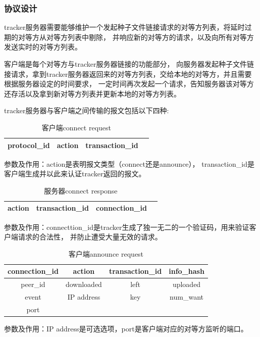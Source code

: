 \documentclass[15pt]{ctexart}
\begin{document}
		\subsubsection{协议设计} %
		\label{ssub:协议设计}
			\par tracker服务器需要能够维护一个发起种子文件链接请求的对等方列表，将延时过期的对等方从对等方列表中剔除，
			并响应新的对等方的请求，以及向所有对等方发送实时的对等方列表。
			\par 客户端是每个对等方与tracker服务器链接的功能部分，
			向服务器发起种子文件链接请求，拿到tracker服务器返回来的对等方列表，交给本地的对等方，并且需要根据服务器设定的时间要求，
			一定时间再次发起一个请求，告知服务器该对等方还存活以及拿到新对等方列表并更新本地的对等方列表。
			\\
			\par tracker服务器与客户端之间传输的报文包括以下四种:
			\begin{table}[H]
				\centering
				\begin{tabular}{|c|c|c|c|}
					\hline
					protocol\_id & action & transaction\_id \\
					\hline
				\end{tabular}
				\caption{客户端connect request}
			\end{table}
			\par 参数及作用：action是表明报文类型（connect还是announce），
			transaction\_id是客户端生成并以此来认证tracker返回的报文。
			\begin{table}[H]
				\centering
				\begin{tabular}{|c|c|c|c|}
					\hline
					action & transaction\_id & connection\_id \\
					\hline
				\end{tabular}
				\caption{服务器connect response}
			\end{table}
			\par 参数及作用：connecttion\_id是tracker生成了独一无二的一个验证码，用来验证客户端请求的合法性，
			并防止遭受大量无效的请求。
			\begin{table}[H]
				\centering
				\begin{tabular}{|c|c|c|c|}
					\hline
					connection\_id & action     & transaction\_id & info\_hash \\
					\hline
					peer\_id       & downloaded & left            & uploaded   \\
					\hline
					event          & IP address & key             & num\_want  \\
					\hline
					port           &            &                 &            \\
					\hline
				\end{tabular}
				\caption{客户端announce request}
			\end{table}
			\par 参数及作用：IP address是可选选项，port是客户端对应的对等方监听的端口。
			
\end{document}

